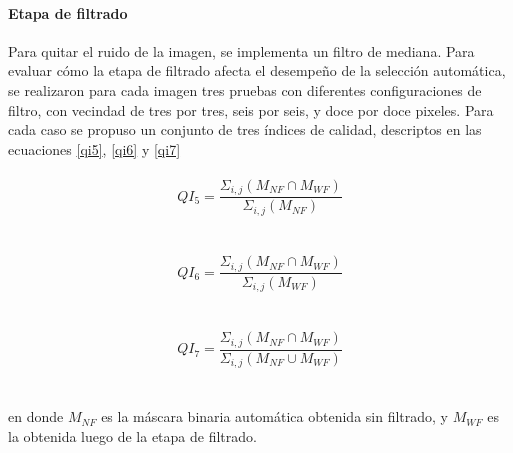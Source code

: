 \paragraph{Etapa de filtrado}
Para quitar el ruido de la imagen, se implementa un filtro de mediana. Para evaluar cómo la etapa de filtrado afecta el desempeño de la selección automática, se realizaron para cada imagen tres pruebas con diferentes configuraciones de filtro, con vecindad de tres por tres, seis por seis, y  doce por doce pixeles. Para cada caso se propuso un conjunto de tres índices de calidad, descriptos en las ecuaciones \ref{qi5}, \ref{qi6} y \ref{qi7}
\\
\\
 \begin{equation}
    QI_5=\frac{\Sigma _{i,j}(M_{NF}\cap M_{WF})}{\Sigma _{i,j}(M_{NF}) }
    \label{qi5}
\end{equation}
\\
\\
 \begin{equation}
    QI_6=\frac{\Sigma_{i,j}(M_{NF}\cap M_{WF})}{\Sigma _{i,j}(M_{WF}) }
    \label{qi6}
\end{equation}
\\
\\
\begin{equation}
    QI_7=\frac{\Sigma _{i,j}(M_{NF}\cap M_{WF})}{\Sigma _{i,j}(M_{NF}\cup M_{WF}) }
    \label{qi7}
\end{equation}
\\
\\
en donde $M_{NF}$ es la máscara binaria automática obtenida sin filtrado, y $M_{WF}$ es la obtenida luego de la etapa de filtrado.



\color{black} 





